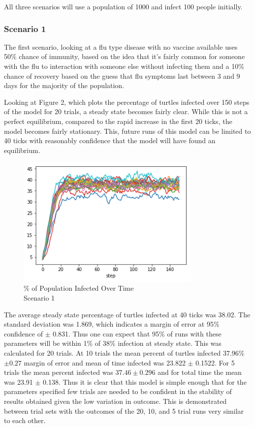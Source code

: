 \documentclass[11pt]{article} %
\begin{document}
All three scenarios will use a population of 1000 and infect 100 people initially. 

\subsubsection{Scenario 1}

The first scenario, looking at a flu type disease with no vaccine available uses 50\% chance of immunity, based on the idea that it's fairly common for someone with the flu to interaction with someone else without infecting them and a 10\% chance of recovery based on the guess that flu symptoms last between 3 and 9 days for the majority of the population.


Looking at Figure 2, which plots the percentage of turtles infected over 150 steps of the model for 20 trials, a steady state becomes fairly clear. While this is not a perfect equilibrium, compared to the rapid increase in the first 20 ticks, the model becomes fairly stationary.  This, future runs of this model can be limited to 40 ticks with reasonably confidence that the model will have found an equilibrium. 

\begin{figure}
\centering
\includegraphics[width=0.8\textwidth]{scen_1_steady_state}
\caption{\% of Population Infected Over Time \\ Scenario 1}
\end{figure}



The average steady state percentage of turtles infected at 40 ticks was 38.02. The standard deviation was 1.869, which indicates a margin of error at 95\% confidence of $\pm$ 0.831. Thus one can expect that 95\% of runs with these parameters will be within 1\% of 38\% infection at steady state. This was calculated for 20 trials. At 10 trials the mean percent of turtles infected 37.96\% $\pm0.27$ margin of error and mean of time infected was 23.822 $\pm$ 0.1522. For 5 trials the mean percent infected was $37.46\pm0.296$ and for total time the mean was 23.91 $\pm$ 0.138. Thus it is clear that this model is simple enough that for the parameters specified few trials are needed to be confident in the stability of results obtained given the low variation in outcome. This is demonstrated between trial sets with the outcomes of the 20, 10, and 5 trial runs very similar to each other. 
\end{document}
